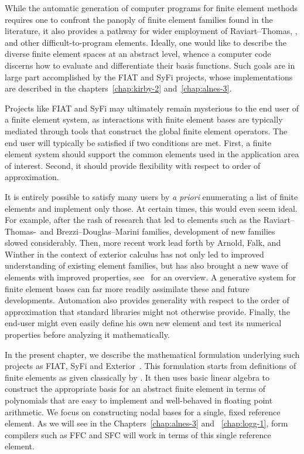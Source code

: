 While the automatic generation of computer programs for finite element
methods requires one to confront the panoply of finite element families
found in the literature, it also provides a pathway for wider employment
of Raviart--Thomas, \nedelec, and other difficult-to-program elements.
Ideally, one would like to describe the diverse finite element spaces
at an abstract level, whence a computer code discerns how to evaluate
and differentiate their basis functions.  Such goals are in large part
accomplished by the FIAT and SyFi projects, whose implementations are
described in the chapters~\ref{chap:kirby-2}
and~\ref{chap:alnes-3}.

Projects like FIAT and SyFi may ultimately remain mysterious to the end
user of a finite element system, as interactions with finite element
bases are typically mediated through tools that construct the global
finite element operators.  The end user will typically be satisfied if
two conditions are met.  First, a finite element system should support
the common elements used in the application area of interest.  Second,
it should provide flexibility with respect to order of approximation.

It is entirely possible to satisfy many users by \emph{a priori}
enumerating a list of finite elements and implement only those.
At certain times, this would even seem ideal.  For example, after the rash
of research that led to elements such as the Raviart--Thomas-\nedelec\
and Brezzi--Douglas--Marini families, development of new families
slowed considerably.  Then, more recent work lead forth by Arnold,
Falk, and Winther in the context of exterior calculus has not only led
to improved understanding of existing element families, but has also
brought a new wave of elements with improved properties, see~\citet{ArnoldFalkWinther2006} for an overview.  A generative
system for finite element bases can far more readily assimilate these
and future developments.  Automation also provides generality with
respect to the order of approximation that standard libraries might
not otherwise provide. Finally, the end-user might even easily define
his own new element and test its numerical properties before analyzing
it mathematically.

In the present chapter, we describe the mathematical
formulation underlying such projects as FIAT, SyFi and
Exterior~\citep{LoggMardal2009}.  This formulation starts from definitions
of finite elements as given classically by \citet{Ciarlet2002}.
It then uses basic linear algebra to construct the appropriate basis
for an abstract finite element in terms of polynomials that are easy to
implement and well-behaved in floating point arithmetic.  We focus on
constructing nodal bases for a single, fixed reference element.  As we
will see in the Chapters~\ref{chap:alnes-3} and ~\ref{chap:logg-1},
form compilers such as FFC and SFC will work in terms
of this single reference element.

